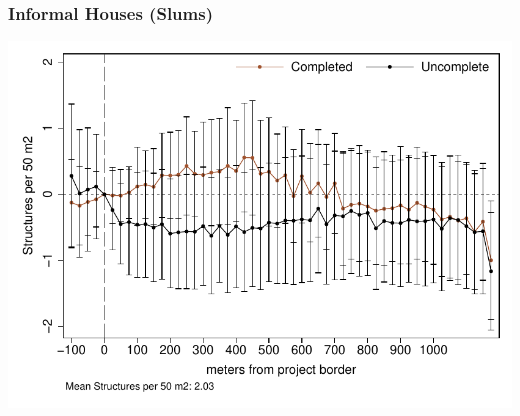 \documentclass[aspectratio=149]{beamer}
\begin{document}
\begin{frame}
\frametitle{Informal Houses (Slums)}
\begin{center}
\includegraphics[scale=.78]{distplot_bblu_inf.pdf}
\vspace{-3mm}
\end{center}
\end{frame}





\end{document}
